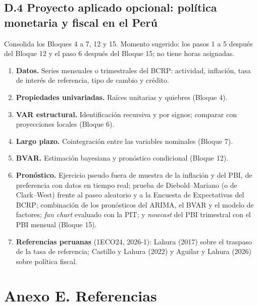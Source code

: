 \documentclass[11pt,a4paper]{article}
\begin{document}
\subsection*{D.4 Proyecto aplicado opcional: política monetaria y fiscal en el Perú}
Consolida los Bloques 4 a 7, 12 y 15. Momento sugerido: los pasos 1 a 5
después del Bloque 12 y el paso 6 después del Bloque 15; no tiene horas
asignadas.
\begin{enumerate}[leftmargin=1.6em,itemsep=2pt]
  \item \textbf{Datos.} Series mensuales o trimestrales del BCRP: actividad,
        inflación, tasa de interés de referencia, tipo de cambio y crédito.
  \item \textbf{Propiedades univariadas.} Raíces unitarias y quiebres (Bloque 4).
  \item \textbf{VAR estructural.} Identificación recursiva y por signos; comparar
        con proyecciones locales (Bloque 6).
  \item \textbf{Largo plazo.} Cointegración entre las variables nominales
        (Bloque 7).
  \item \textbf{BVAR.} Estimación bayesiana y pronóstico condicional
        (Bloque 12).
  \item \textbf{Pronóstico.} Ejercicio pseudo fuera de muestra de la
        inflación y del PBI, de preferencia con datos en tiempo real; prueba
        de Diebold--Mariano (o de Clark--West) frente al paseo aleatorio y a
        la Encuesta de Expectativas del BCRP; combinación de los pronósticos
        del ARIMA, el BVAR y el modelo de factores; \emph{fan chart} evaluado
        con la PIT; y \emph{nowcast} del PBI trimestral con el PBI mensual
        (Bloque 15).
  \item \textbf{Referencias peruanas} (1ECO24, 2026-1): Lahura (2017) sobre el
        traspaso de la tasa de referencia; Castillo y Lahura (2022) y Aguilar
        y Lahura (2026) sobre política fiscal.
\end{enumerate}

\section*{Anexo E. Referencias}
\end{document}
